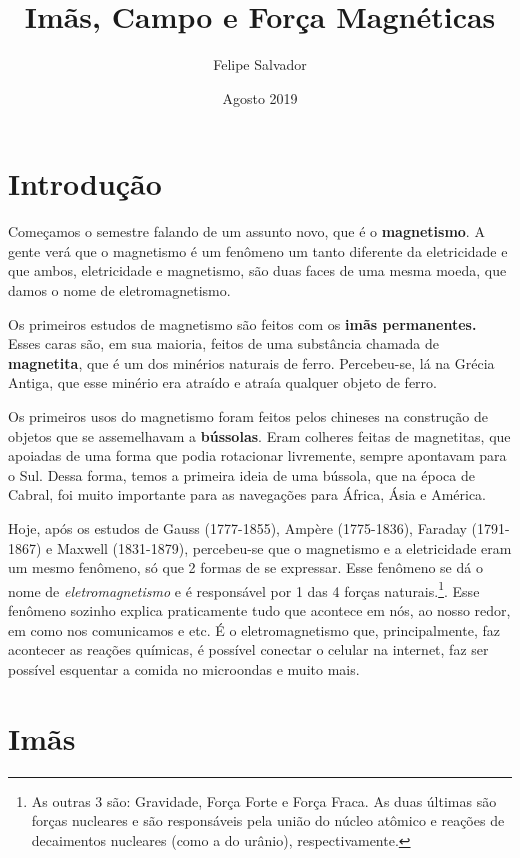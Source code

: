\documentclass[12pt]{extarticle}
\title{Imãs, Campo e Força Magnéticas}
\author{Felipe Salvador}
\date{Agosto 2019}
\newcommand{\<}{\langle}
\renewcommand{\>}{\rangle}
\theoremstyle{definition}
\begin{document}
\maketitle

\section{Introdução}

Começamos o semestre falando de um assunto novo, que é o \textbf{magnetismo}. A gente verá que o magnetismo é um fenômeno um tanto diferente da eletricidade e que ambos, eletricidade e magnetismo, são duas faces de uma mesma moeda, que damos o nome de eletromagnetismo.

Os primeiros estudos de magnetismo são feitos com os \textbf{imãs permanentes.} Esses caras são, em sua maioria, feitos de uma substância chamada de \textbf{magnetita}, que é um dos minérios naturais de ferro. Percebeu-se, lá na Grécia Antiga, que esse minério era atraído e atraía qualquer objeto de ferro.

Os primeiros usos do magnetismo foram feitos pelos chineses na construção de objetos que se assemelhavam a \textbf{bússolas}. Eram colheres feitas de magnetitas, que apoiadas de uma forma que podia rotacionar livremente, sempre apontavam para o Sul. Dessa forma, temos a primeira ideia de uma bússola, que na época de Cabral, foi muito importante para as navegações para África, Ásia e América.

Hoje, após os estudos de Gauss (1777-1855), Ampère (1775-1836), Faraday (1791-1867) e Maxwell (1831-1879), percebeu-se que o magnetismo e a eletricidade eram um mesmo fenômeno, só que 2 formas de se expressar. Esse fenômeno se dá o nome de \textit{eletromagnetismo} e é responsável por 1 das 4 forças naturais.\footnote{As outras 3 são: Gravidade, Força Forte e Força Fraca. As duas últimas são forças nucleares e são responsáveis pela união do núcleo atômico e reações de decaimentos nucleares (como a do urânio), respectivamente.}. Esse fenômeno sozinho explica praticamente tudo que acontece em nós, ao nosso redor, em como nos comunicamos e etc. É o eletromagnetismo que, principalmente, faz acontecer as reações químicas, é possível conectar o celular na internet, faz ser possível esquentar a comida no microondas e muito mais.

\section{Imãs}
\end{document}
